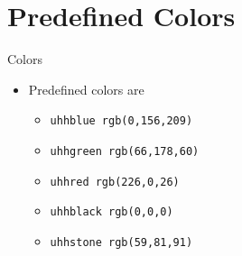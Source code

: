 \section{Predefined Colors}


\begin{frame}[c, fragile]{Colors}
    \begin{itemize}
        \item Predefined colors are
            \begin{itemize}
                \item {\color{uhhblue} \verb|uhhblue rgb(0,156,209)|}
                \item {\color{uhhgreen} \verb|uhhgreen rgb(66,178,60)|}
                \item {\color{uhhred} \verb|uhhred rgb(226,0,26)|}
                \item {\color{uhhblack} \verb|uhhblack rgb(0,0,0)|}
                \item {\color{uhhstone} \verb|uhhstone rgb(59,81,91)|}
            \end{itemize}
    \end{itemize}
\end{frame}
